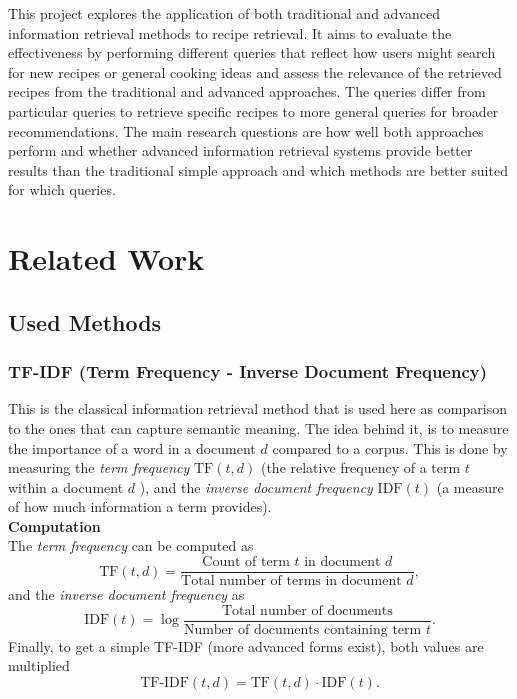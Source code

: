 \documentclass[a4paper,12pt]{article}
\begin{document}
This project explores the application of both traditional and advanced information retrieval methods to recipe retrieval.
It aims to evaluate the effectiveness by performing different queries that reflect how users might search for new recipes or general cooking ideas and assess the relevance of the retrieved recipes from the traditional and advanced approaches.
The queries differ from particular queries to retrieve specific recipes to more general queries for broader recommendations.
The main research questions are how well both approaches perform and whether advanced information retrieval systems provide better results than the traditional simple approach and which methods are better suited for which queries.

\section{Related Work}
\subsection{Used Methods}
\subsubsection{TF-IDF (Term Frequency - Inverse Document Frequency)}
This is the classical information retrieval method that is used here as comparison to the ones that can capture semantic meaning. The idea behind it, is to measure the importance of a word in a document $d$ compared to a corpus. This is done by measuring the \textit{term frequency} $\text{TF}(t, d)$ (the relative frequency of a term $t$ within a document $d$ ), and the \textit{inverse document frequency} $\text{IDF}(t)$ (a measure of how much information a term provides). \\

\noindent \textbf{Computation} \\
The \textit{term frequency} can be computed as
$$
\text{TF}(t,d)=
\frac
{\text{Count of term } t \text{ in document } d}
{\text{Total number of terms in document } d},
$$
and the \textit{inverse document frequency} as 
$$
\text{IDF}(t) = 
\log \frac
{\text{Total number of documents}}
{\text{Number of documents containing term } t}.
$$
Finally, to get a simple TF-IDF (more advanced forms exist), both values are multiplied
$$
\text{TF-IDF}(t,d)=\text{TF}(t,d) \cdot \text{IDF}(t).
$$
\end{document}
